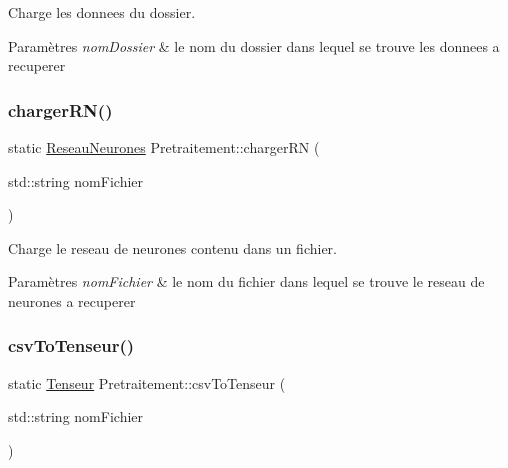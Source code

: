 Charge les donnees du dossier. 


\begin{DoxyParams}{Paramètres}
{\em nom\+Dossier} & le nom du dossier dans lequel se trouve les donnees a recuperer \\
\hline
\end{DoxyParams}
\mbox{\label{class_pretraitement_a2d1e9cdbe1b865565f63c435923ec8e3}} 
\subsubsection{\texorpdfstring{charger\+R\+N()}{chargerRN()}}
{\footnotesize\ttfamily static \hyperlink{class_reseau_neurones}{Reseau\+Neurones} Pretraitement\+::charger\+RN (\begin{DoxyParamCaption}\item[{std\+::string}]{nom\+Fichier }\end{DoxyParamCaption})\hspace{0.3cm}{\ttfamily [static]}}



Charge le reseau de neurones contenu dans un fichier. 


\begin{DoxyParams}{Paramètres}
{\em nom\+Fichier} & le nom du fichier dans lequel se trouve le reseau de neurones a recuperer \\
\hline
\end{DoxyParams}
\mbox{\label{class_pretraitement_a588810b1b86e11464cea64443358ae5a}} 
\subsubsection{\texorpdfstring{csv\+To\+Tenseur()}{csvToTenseur()}}
{\footnotesize\ttfamily static \hyperlink{class_tenseur}{Tenseur} Pretraitement\+::csv\+To\+Tenseur (\begin{DoxyParamCaption}\item[{std\+::string}]{nom\+Fichier }\end{DoxyParamCaption})\hspace{0.3cm}{\ttfamily [static]}}



